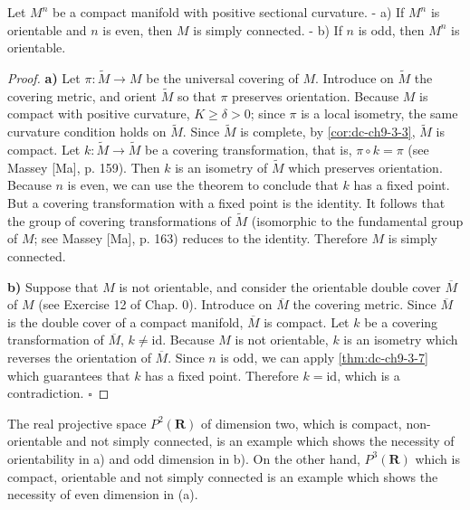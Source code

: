 \begin{corollary}[Synge]
  \label{cor:dc-ch9-3-10}
  Let $M^n$ be a compact manifold with positive sectional curvature.
  - a) If $M^n$ is orientable and $n$ is even, then $M$ is simply connected.
  - b) If $n$ is odd, then $M^n$ is orientable.
\end{corollary}
\begin{proof}
  \textbf{a)} Let $\pi:\tilde M\to M$ be the universal covering of $M$. Introduce on
  $\tilde M$ the covering metric, and orient $\tilde M$ so that $\pi$ preserves
  orientation. Because $M$ is compact with positive curvature, $K\ge\delta>0$; since
  $\pi$ is a local isometry, the same curvature condition holds on $\tilde M$. Since
  $\tilde M$ is complete, by \cref{cor:dc-ch9-3-3}, $\tilde M$ is compact. Let
  $k:\tilde M\to\tilde M$ be a covering transformation, that is, $\pi\circ k=\pi$
  (see Massey [Ma], p. 159). Then $k$ is an isometry of $\tilde M$ which preserves
  orientation. Because $n$ is even, we can use the theorem to conclude that $k$ has a
  fixed point. But a covering transformation with a fixed point is the identity. It
  follows that the group of covering transformations of $\tilde M$ (isomorphic to the
  fundamental group of $M$; see Massey [Ma], p. 163) reduces to the identity.
  Therefore $M$ is simply connected.
  
  \textbf{b)} Suppose that $M$ is not orientable, and consider the orientable double cover
  $\overline M$ of $M$ (see Exercise 12 of Chap. 0). Introduce on $\overline M$ the
  covering metric. Since $\overline M$ is the double cover of a compact manifold,
  $\overline M$ is compact. Let $k$ be a covering transformation of $\overline M$,
  $k\ne\mathrm{id}$. Because $M$ is not orientable, $k$ is an isometry which reverses
  the orientation of $\overline M$. Since $n$ is odd, we can apply \cref{thm:dc-ch9-3-7} which
  guarantees that $k$ has a fixed point. Therefore $k=\mathrm{id}$, which is a
  contradiction. $\square$
\end{proof}

\begin{remark}[Remark 3.11]
  \label{rem:dc-ch9-3-11}
  The real projective space $P^2(\mathbf{R})$ of dimension two, which is compact,
  non-orientable and not simply connected, is an example which shows the necessity of
  orientability in a) and odd dimension in b). On the other hand, $P^3(\mathbf{R})$
  which is compact, orientable and not simply connected is an example which shows the
  necessity of even dimension in (a).
\end{remark}
